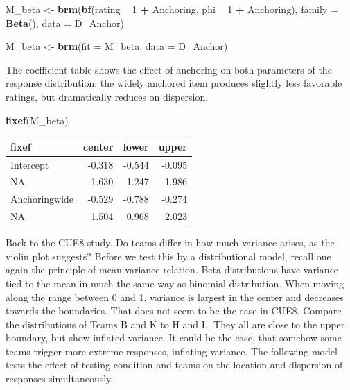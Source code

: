 \documentclass[]{svmono}
\newenvironment{Shaded}{\begin{snugshade}}{\end{snugshade}}
\newcommand{\KeywordTok}[1]{\textcolor[rgb]{0.13,0.29,0.53}{\textbf{#1}}}
\newcommand{\DataTypeTok}[1]{\textcolor[rgb]{0.13,0.29,0.53}{#1}}
\newcommand{\DecValTok}[1]{\textcolor[rgb]{0.00,0.00,0.81}{#1}}
\newcommand{\StringTok}[1]{\textcolor[rgb]{0.31,0.60,0.02}{#1}}
\newcommand{\OperatorTok}[1]{\textcolor[rgb]{0.81,0.36,0.00}{\textbf{#1}}}
\newcommand{\NormalTok}[1]{#1}
\theoremstyle{definition}
\theoremstyle{definition}
\theoremstyle{definition}
\theoremstyle{remark}
\begin{document}
\begin{Shaded}
\begin{Highlighting}[]
\NormalTok{M_beta <-}\StringTok{ }\KeywordTok{brm}\NormalTok{(}\KeywordTok{bf}\NormalTok{(rating }\OperatorTok{~}\StringTok{ }\DecValTok{1} \OperatorTok{+}\StringTok{ }\NormalTok{Anchoring,}
\NormalTok{              phi }\OperatorTok{~}\StringTok{ }\DecValTok{1} \OperatorTok{+}\StringTok{ }\NormalTok{Anchoring),}
           \DataTypeTok{family =} \KeywordTok{Beta}\NormalTok{(),}
           \DataTypeTok{data =}\NormalTok{ D_Anchor)}

\NormalTok{M_beta <-}\StringTok{ }\KeywordTok{brm}\NormalTok{(}\DataTypeTok{fit =}\NormalTok{ M_beta, }\DataTypeTok{data =}\NormalTok{ D_Anchor)}
\end{Highlighting}
\end{Shaded}

The coefficient table shows the effect of anchoring on both parameters
of the response distribution: the widely anchored item produces slightly
less favorable ratings, but dramatically reduces on dispersion.

\begin{Shaded}
\begin{Highlighting}[]
\KeywordTok{fixef}\NormalTok{(M_beta)}
\end{Highlighting}
\end{Shaded}

\begin{longtable}[]{@{}lrrr@{}}
\toprule
fixef & center & lower & upper\tabularnewline
\midrule
\endhead
Intercept & -0.318 & -0.544 & -0.095\tabularnewline
NA & 1.630 & 1.247 & 1.986\tabularnewline
Anchoringwide & -0.529 & -0.788 & -0.274\tabularnewline
NA & 1.504 & 0.968 & 2.023\tabularnewline
\bottomrule
\end{longtable}

Back to the CUE8 study. Do teams differ in how much variance arises, as
the violin plot suggests? Before we test this by a distributional model,
recall one again the principle of mean-variance relation. Beta
distributions have variance tied to the mean in much the same way as
binomial distribution. When moving along the range between 0 and 1,
variance is largest in the center and decreases towards the boundaries.
That does not seem to be the case in CUE8. Compare the distributions of
Teams B and K to H and L. They all are close to the upper boundary, but
show inflated variance. It could be the case, that somehow some teams
trigger more extreme responses, inflating variance. The following model
tests the effect of testing condition and teams on the location and
dispersion of responses simultaneously.
\end{document}
